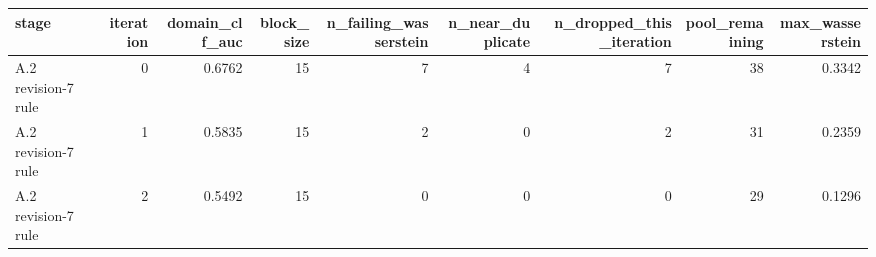 \begin{tabular}{lrrrrrrrr}
\toprule
stage & iteration & domain\_clf\_auc & block\_size & n\_failing\_wasserstein & n\_near\_duplicate & n\_dropped\_this\_iteration & pool\_remaining & max\_wasserstein \\
\midrule
A.2 revision-7 rule & 0 & 0.6762 & 15 & 7 & 4 & 7 & 38 & 0.3342 \\
A.2 revision-7 rule & 1 & 0.5835 & 15 & 2 & 0 & 2 & 31 & 0.2359 \\
A.2 revision-7 rule & 2 & 0.5492 & 15 & 0 & 0 & 0 & 29 & 0.1296 \\
\bottomrule
\end{tabular}
